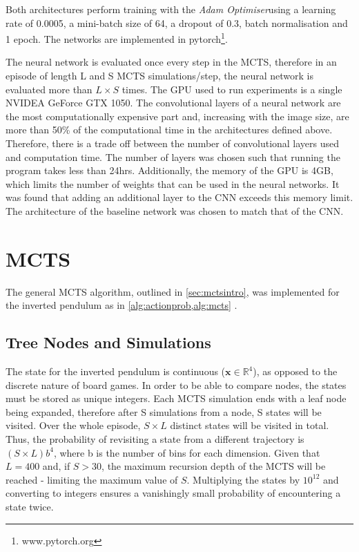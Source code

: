 \documentclass[../main.tex]{subfiles}
\begin{document}
Both architectures perform training with the \textit{Adam Optimiser}using a learning rate of 0.0005, a mini-batch size of 64, a dropout of 0.3, batch normalisation and 1 epoch. The networks are implemented in pytorch\footnote{www.pytorch.org}.

The neural network is evaluated once every step in the MCTS, therefore in an episode of length L and S MCTS simulations/step, the neural network is evaluated more than $L\times S$ times. The GPU used to run experiments is a single NVIDEA GeForce GTX 1050. The convolutional layers of a neural network are the most computationally expensive part and, increasing with the image size, are more than 50\% of the computational time in the architectures defined above. Therefore, there is a trade off between the number of convolutional layers used and computation time. The number of layers was chosen such that running the program takes less than 24hrs. Additionally, the memory of the GPU is 4GB, which limits the number of weights that can be used in the neural networks. It was found that adding an additional layer to the CNN exceeds this memory limit. The architecture of the baseline network was chosen to match that of the CNN.

\section{MCTS}

The general MCTS algorithm, outlined in \cref{sec:mctsintro}, was implemented for the inverted pendulum as in \cref{alg:actionprob,alg:mcts} .

\subsection{Tree Nodes and Simulations}

The state for the inverted pendulum is continuous ($\boldsymbol{x} \in \mathbb{R}^4$), as opposed to the discrete nature of board games. In order to be able to compare nodes, the states must be stored as unique integers. Each MCTS simulation ends with a leaf node being expanded, therefore after S simulations from a node, S states will be visited. Over the whole episode, $S\times L$ distinct states will be visited in total. Thus, the probability of revisiting a state from a different trajectory is $(S \times L)b^4$, where b is the number of bins for each dimension. Given that $L=400$ and, if $S>30$, the maximum recursion depth of the MCTS will be reached - limiting the maximum value of $S$. Multiplying the states by $10^{12}$ and converting to integers ensures a vanishingly small probability of encountering a state twice.
\end{document}
